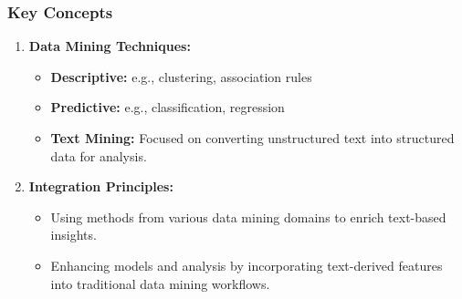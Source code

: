 \documentclass[aspectratio=169]{beamer}
\begin{document}
\begin{frame}[fragile]
    \frametitle{Key Concepts}
    \begin{enumerate}
        \item \textbf{Data Mining Techniques:}
            \begin{itemize}
                \item \textbf{Descriptive:} e.g., clustering, association rules
                \item \textbf{Predictive:} e.g., classification, regression
                \item \textbf{Text Mining:} Focused on converting unstructured text into structured data for analysis.
            \end{itemize}
        \item \textbf{Integration Principles:}
            \begin{itemize}
                \item Using methods from various data mining domains to enrich text-based insights.
                \item Enhancing models and analysis by incorporating text-derived features into traditional data mining workflows.
            \end{itemize}
    \end{enumerate}
\end{frame}
\end{document}
